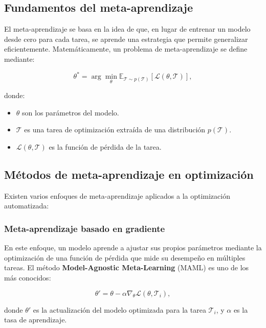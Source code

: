 \begin{itemize}
		\subsection{Fundamentos del meta-aprendizaje}
		
		El meta-aprendizaje se basa en la idea de que, en lugar de entrenar un modelo desde cero para cada tarea, se aprende una estrategia que permite generalizar eficientemente. Matemáticamente, un problema de meta-aprendizaje se define mediante:
		
		\begin{equation}
			\theta^* = \arg \min_{\theta} \mathbb{E}_{\mathcal{T} \sim p(\mathcal{T})} \left[ \mathcal{L}(\theta, \mathcal{T}) \right],
		\end{equation}
		
		donde:
		\begin{itemize}
			\item \( \theta \) son los parámetros del modelo.
			\item \( \mathcal{T} \) es una tarea de optimización extraída de una distribución \( p(\mathcal{T}) \).
			\item \( \mathcal{L}(\theta, \mathcal{T}) \) es la función de pérdida de la tarea.
		\end{itemize}
		
		\subsection{Métodos de meta-aprendizaje en optimización}
		
		Existen varios enfoques de meta-aprendizaje aplicados a la optimización automatizada:
		
		\subsubsection{Meta-aprendizaje basado en gradiente}
		
		En este enfoque, un modelo aprende a ajustar sus propios parámetros mediante la optimización de una función de pérdida que mide su desempeño en múltiples tareas. El método \textbf{Model-Agnostic Meta-Learning} (MAML) \cite{finn2017model} es uno de los más conocidos:
		
		\begin{equation}
			\theta' = \theta - \alpha \nabla_{\theta} \mathcal{L}(\theta, \mathcal{T}_i),
		\end{equation}
		
		donde \( \theta' \) es la actualización del modelo optimizada para la tarea \( \mathcal{T}_i \), y \( \alpha \) es la tasa de aprendizaje.
		

\end{itemize}
